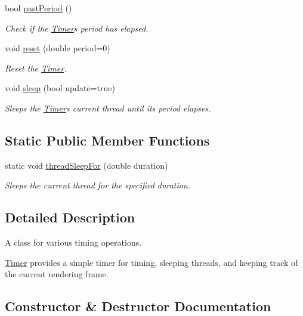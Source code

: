 \begin{DoxyCompactItemize}
bool \hyperlink{classtsgl_1_1_timer_ac7c908b06a735f09841367c7067f44dd}{past\+Period} ()
\begin{DoxyCompactList}\small\item\em Check if the \hyperlink{classtsgl_1_1_timer}{Timer}\textquotesingle{}s period has elapsed. \end{DoxyCompactList}\item 
void \hyperlink{classtsgl_1_1_timer_a67a01c03c033c52056b7f1c733cd93e4}{reset} (double period=0)
\begin{DoxyCompactList}\small\item\em Reset the \hyperlink{classtsgl_1_1_timer}{Timer}. \end{DoxyCompactList}\item 
void \hyperlink{classtsgl_1_1_timer_a5c6e0dca6793d48c675e05b983da7f07}{sleep} (bool update=true)
\begin{DoxyCompactList}\small\item\em Sleeps the \hyperlink{classtsgl_1_1_timer}{Timer}\textquotesingle{}s current thread until its period elapses. \end{DoxyCompactList}\end{DoxyCompactItemize}
\subsection*{Static Public Member Functions}
\begin{DoxyCompactItemize}
\item 
static void \hyperlink{classtsgl_1_1_timer_ae8c5b39a6c5cae2a24abe2a298b05b64}{thread\+Sleep\+For} (double duration)
\begin{DoxyCompactList}\small\item\em Sleeps the current thread for the specified duration. \end{DoxyCompactList}\end{DoxyCompactItemize}


\subsection{Detailed Description}
A class for various timing operations. 

\hyperlink{classtsgl_1_1_timer}{Timer} provides a simple timer for timing, sleeping threads, and keeping track of the current rendering frame. 

\subsection{Constructor \& Destructor Documentation}
\mbox{\label{classtsgl_1_1_timer_abd022bb9ea6ddf5b69ff645ac8f5594d}} 
